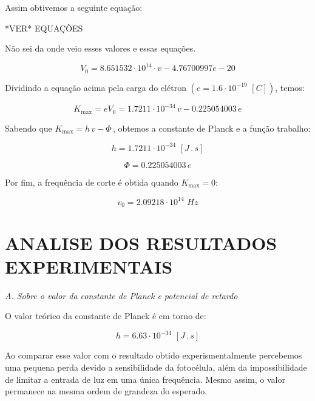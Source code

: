 \documentclass[10pt,twocolumn,letterpaper]{article}
\begin{document}
\noindent Assim obtivemos a seguinte equação:

{\Huge \color{red} *VER* EQUAÇÕES}

{\color{red} Não sei da onde veio esses valores e essas equações.}

\begin{equation*}
    V_0 = 8.651532\cdot 10^{14} \cdot v - 4.76700997e-20
\end{equation*}

\hspace{1cm} Dividindo a equação acima pela carga do elétron $(e =
1.6 \cdot 10^{-19} \,\, [C])$, temos:

\begin{equation*}
    K_{\max} = eV_0 = 1.7211 \cdot 10^{-34}\,v - 0.225054003\,e
\end{equation*}

\hspace{1cm} Sabendo que $K_{\max} = h\,v - \Phi\,$, obtemos a constante de
Planck e a função trabalho:

\begin{equation*}
    h = 1.7211\cdot 10^{-34} \,\, [J\,.\,s]
\end{equation*}

\begin{equation*}
    \Phi = 0.225054003\,e
\end{equation*}

\noindent Por fim, a frequência de corte é obtida quando $K_{\max} = 0$:

\begin{equation*}
    v_0 = 2.09218 \cdot 10^{14} \,\, Hz
\end{equation*}


\section{ANALISE DOS RESULTADOS EXPERIMENTAIS}

\noindent\textit{A. Sobre o valor da constante de Planck e potencial de
retardo}

\noindent O valor teórico da constante de Planck é em torno de:

\begin{equation*}
    h = 6.63 \cdot 10^{-34} \,\, [J\,.\,s]
\end{equation*}

\hspace{1cm} Ao comparar esse valor com o resultado obtido experismentalmente percebemos uma pequena perda devido a sensibilidade da fotocélula, além da impossibilidade de limitar a entrada de luz em uma única frequência. Mesmo assim, o valor permanece na mesma ordem de grandeza do esperado.
\end{document}

